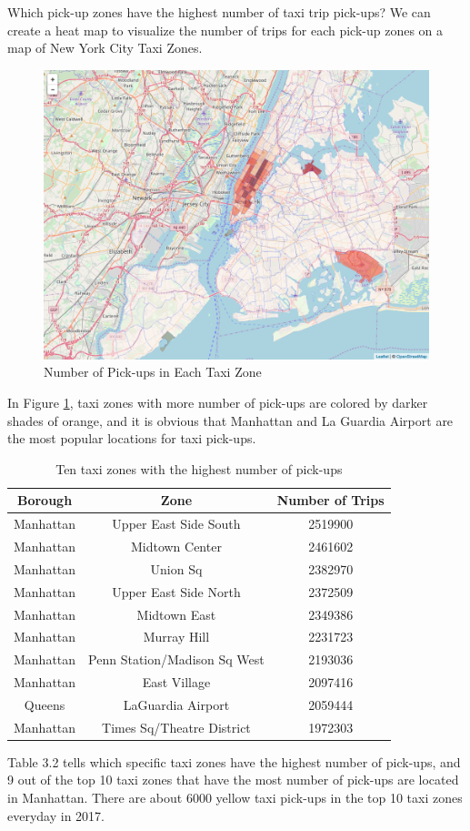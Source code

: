 \documentclass[12pt,twoside]{reedthesis}
\theoremstyle{definition}
\theoremstyle{definition}
\theoremstyle{definition}
\theoremstyle{remark}
\begin{document}
Which pick-up zones have the highest number of taxi trip pick-ups? We
can create a heat map to visualize the number of trips for each pick-up
zones on a map of New York City Taxi Zones.
\begin{figure}

{\centering \includegraphics[width=5.84in]{figure/num_trip} 

}

\caption{Number of Pick-ups in Each Taxi Zone}\label{fig:num-trip}
\end{figure}
In Figure \ref{fig:num-trip}, taxi zones with more number of pick-ups
are colored by darker shades of orange, and it is obvious that Manhattan
and La Guardia Airport are the most popular locations for taxi pick-ups.
\begin{table}

\caption{\label{tab:unnamed-chunk-42}Ten taxi zones with the highest number of pick-ups}
\centering
\begin{tabular}[t]{ccc}
\toprule
Borough & Zone & Number of Trips\\
\midrule
Manhattan & Upper East Side South & 2519900\\
Manhattan & Midtown Center & 2461602\\
Manhattan & Union Sq & 2382970\\
Manhattan & Upper East Side North & 2372509\\
Manhattan & Midtown East & 2349386\\
\addlinespace
Manhattan & Murray Hill & 2231723\\
Manhattan & Penn Station/Madison Sq West & 2193036\\
Manhattan & East Village & 2097416\\
Queens & LaGuardia Airport & 2059444\\
Manhattan & Times Sq/Theatre District & 1972303\\
\bottomrule
\end{tabular}
\end{table}
Table 3.2 tells which specific taxi zones have the highest number of
pick-ups, and 9 out of the top 10 taxi zones that have the most number
of pick-ups are located in Manhattan. There are about 6000 yellow taxi
pick-ups in the top 10 taxi zones everyday in 2017.
\end{document}
